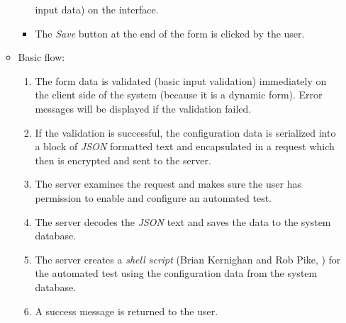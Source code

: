 \begin{enumerate}
\begin{itemize}
\begin{itemize}
                input data) on the
                interface.
            \item The \emph{Save} button at the end of the form is clicked by
                the user.
        \end{itemize}
    \item Basic flow:
        \begin{enumerate}
            \item The form data is validated (basic input validation)
                immediately on the client side of the system (because it is a
                dynamic form). Error messages
                will be displayed if the validation failed.
            \item If the validation is successful, the configuration data is
                serialized into a block of \emph{JSON} \cite{JSON} formatted text and
                encapsulated in a request which then is encrypted and sent to
                the server.
            \item The server examines the request and makes sure the user has
                permission to enable and configure an automated test.
            \item The server decodes the \emph{JSON} text and saves the data to
                the system database.
            \item The server creates a \emph{shell script} 
                (Brian Kernighan and Rob Pike, \cite{shellScript})
                for the automated test using the configuration data from the
                system database.
            \item A success message is returned to the user.
        \end{enumerate}
\end{itemize}


\end{enumerate}
